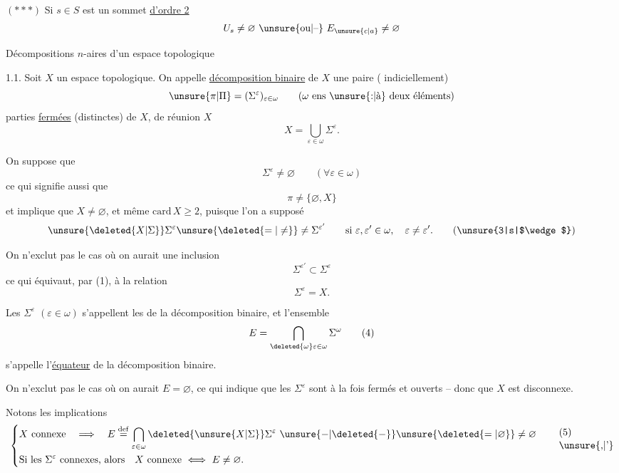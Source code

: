 $(\ast\ast\ast)$ Si $s\in S$ est un sommet \uline{d'ordre 2}    
\[
U_s\ne\varnothing\ \unsure{\text{ou}|\text{--}}\ E_{\unsure{c|a}}\ne\varnothing
\]

\begingroup
\makeatletter\tagsleft@true\makeatother

\noindent Décompositions $n$-aires d'un espace topologique

1.1. Soit $X$ un espace topologique. On appelle \uline{décomposition binaire} de $X$ une paire ( indiciellement)
\[
\unsure{\pi|\Pi}=(\Sigma^\varepsilon)_{\varepsilon\in\omega}\qquad(\omega\ \text{ens \unsure{:|à} deux éléments})
\]
  parties \uline{fermées} (distinctes) de $X$, de réunion $X$
\[
X=\bigcup_{\varepsilon\in\omega}\Sigma^\varepsilon.\tag*{(1)}
\]

On suppose que
\[
\Sigma^\varepsilon\ne\varnothing\qquad(\forall\varepsilon\in\omega)\tag*{(2)}
\]
ce qui signifie aussi que
\[
\pi\ne\{\varnothing,X\}\tag*{$(2')$}
\]
et implique que $X\ne\varnothing$, et même $\mathrm{card}\,X\geq 2$, puisque l'on a supposé
\[
\unsure{\deleted{X|\Sigma}}\Sigma^\varepsilon\unsure{\deleted{=|\ne}}\ne\Sigma^{\varepsilon'}\qquad\text{si }\varepsilon,\varepsilon'\in\omega,\quad\varepsilon\ne\varepsilon'.\tag*{(\unsure{3|s|$\wedge$})}
\]

On n'exclut pas le cas où on aurait une inclusion
\[
\Sigma^{\varepsilon'}\subset\Sigma^\varepsilon
\]
ce qui équivaut, par (1), à la relation
\[
\Sigma^\varepsilon=X.
\]

Les $\Sigma^\varepsilon$ $(\varepsilon\in\omega)$ s'appellent les \uline{} de la décomposition binaire,  et l'ensemble
\[
E=\bigcap_{\deleted{\omega}\varepsilon\in\omega}\Sigma^\omega\tag*{(4)}
\]
s'appelle l'\uline{équateur} de la décomposition binaire.

On n'exclut pas le cas où on aurait $E=\varnothing$, ce qui indique que les $\Sigma^\varepsilon$ \inserted{$(\varepsilon\in\omega)$} sont  à la fois fermés et ouverts -- donc que $X$ est disconnexe.
\endgroup

\begingroup
\makeatletter\tagsleft@true\makeatother
Notons les implications
\[
\left\{\begin{aligned}
&X\ \text{connexe}\quad\Longrightarrow\quad E\overset{\mathrm{def}}{=}\bigcap_{\varepsilon\in\omega}\deleted{\unsure{X|\Sigma}}\Sigma^\varepsilon\ \unsure{-|\deleted{-}}\unsure{\deleted{=|\varnothing}}\ne\varnothing\\
&\text{Si les }\Sigma^\varepsilon\ \text{connexes, alors}\quad X\ \text{connexe}\ \Longleftrightarrow\ E\ne\varnothing.
\end{aligned}\right.\tag*{\shortstack[l]{(5)\\\unsure{,|'}}}
\]

